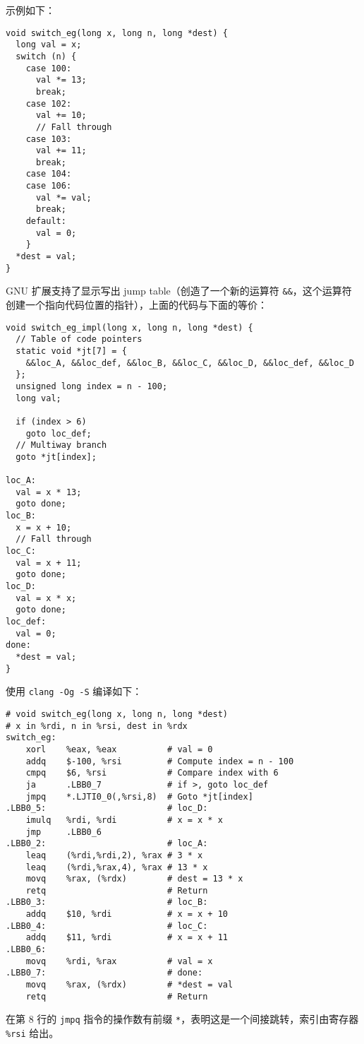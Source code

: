 示例如下：
\begin{verbatim}
void switch_eg(long x, long n, long *dest) {
  long val = x;
  switch (n) {
    case 100:
      val *= 13;
      break;
    case 102:
      val += 10;
      // Fall through
    case 103:
      val += 11;
      break;
    case 104:
    case 106:
      val *= val;
      break;
    default:
      val = 0;
    }
  *dest = val;
}
\end{verbatim}
GNU 扩展支持了显示写出 jump table（创造了一个新的运算符 \verb|&&|，这个运算符创建一个指向代码位置的指针），上面的代码与下面的等价：
\begin{verbatim}
void switch_eg_impl(long x, long n, long *dest) {
  // Table of code pointers
  static void *jt[7] = {
    &&loc_A, &&loc_def, &&loc_B, &&loc_C, &&loc_D, &&loc_def, &&loc_D
  };
  unsigned long index = n - 100;
  long val;

  if (index > 6)
    goto loc_def;
  // Multiway branch
  goto *jt[index];

loc_A:
  val = x * 13;
  goto done;
loc_B:
  x = x + 10;
  // Fall through
loc_C:
  val = x + 11;
  goto done;
loc_D:
  val = x * x;
  goto done;
loc_def:
  val = 0;
done:
  *dest = val;
}
\end{verbatim}

使用 \verb|clang -Og -S| 编译如下：
\begin{verbatim}
# void switch_eg(long x, long n, long *dest)
# x in %rdi, n in %rsi, dest in %rdx
switch_eg:
    xorl    %eax, %eax          # val = 0
    addq    $-100, %rsi         # Compute index = n - 100
    cmpq    $6, %rsi            # Compare index with 6
    ja      .LBB0_7             # if >, goto loc_def
    jmpq    *.LJTI0_0(,%rsi,8)  # Goto *jt[index]
.LBB0_5:                        # loc_D:
    imulq   %rdi, %rdi          # x = x * x
    jmp     .LBB0_6
.LBB0_2:                        # loc_A:
    leaq    (%rdi,%rdi,2), %rax # 3 * x
    leaq    (%rdi,%rax,4), %rax # 13 * x
    movq    %rax, (%rdx)        # dest = 13 * x
    retq                        # Return
.LBB0_3:                        # loc_B:
    addq    $10, %rdi           # x = x + 10
.LBB0_4:                        # loc_C:
    addq    $11, %rdi           # x = x + 11
.LBB0_6:
    movq    %rdi, %rax          # val = x
.LBB0_7:                        # done:
    movq    %rax, (%rdx)        # *dest = val
    retq                        # Return
\end{verbatim}

在第 8 行的 \verb|jmpq| 指令的操作数有前缀 \verb|*|，表明这是一个间接跳转，索引由寄存器 \verb|%rsi| 给出。

